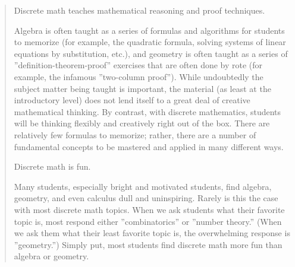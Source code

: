 \documentclass[letterpaper, twoside]{tufte-book}
\begin{document}
\begin{quote}
\vspace*{0.25cm}
\noindent
{\large\color{blue}Discrete math teaches mathematical reasoning and proof techniques.}

Algebra is often taught as a series of formulas and algorithms for students to memorize
 (for example, the quadratic formula, solving systems of linear equations by
 substitution, etc.), and geometry is often taught as a series of
 ''definition-theorem-proof'' exercises that are often done by rote (for example, the
 infamous ''two-column proof''). While undoubtedly the subject matter being taught is
 important, the material (as least at the introductory level) does not lend itself
 to a great deal of creative mathematical thinking. By contrast, with discrete
 mathematics, students will be thinking flexibly and creatively right out of the
 box. There are relatively few formulas to memorize; rather, there are a number
 of fundamental concepts to be mastered and applied in many different ways.

\vspace*{0.25cm}         
\noindent
{\large\color{blue}Discrete math is fun.}

Many students, especially bright and motivated students, find algebra, geometry, and even calculus dull and uninspiring. Rarely is this the case with most discrete math topics. When we ask students what their favorite topic is, most respond either ''combinatorics'' or ''number theory.'' (When we ask them what their least favorite topic is, the overwhelming response is ''geometry.'') Simply put, most students find discrete math more fun than algebra or geometry.
\end{quote}

\mainmatter
\end{document}
